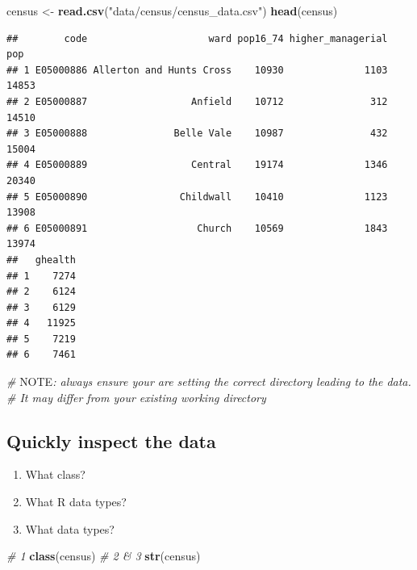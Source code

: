 \documentclass[]{book}
\newenvironment{Shaded}{\begin{snugshade}}{\end{snugshade}}
\newcommand{\AlertTok}[1]{\textcolor[rgb]{0.94,0.16,0.16}{#1}}
\newcommand{\CommentTok}[1]{\textcolor[rgb]{0.56,0.35,0.01}{\textit{#1}}}
\newcommand{\KeywordTok}[1]{\textcolor[rgb]{0.13,0.29,0.53}{\textbf{#1}}}
\newcommand{\NormalTok}[1]{#1}
\newcommand{\StringTok}[1]{\textcolor[rgb]{0.31,0.60,0.02}{#1}}
\begin{document}
\begin{Shaded}
\begin{Highlighting}[]
\NormalTok{census <-}\StringTok{ }\KeywordTok{read.csv}\NormalTok{(}\StringTok{"data/census/census_data.csv"}\NormalTok{)}
\KeywordTok{head}\NormalTok{(census)}
\end{Highlighting}
\end{Shaded}

\begin{verbatim}
##        code                     ward pop16_74 higher_managerial   pop
## 1 E05000886 Allerton and Hunts Cross    10930              1103 14853
## 2 E05000887                  Anfield    10712               312 14510
## 3 E05000888               Belle Vale    10987               432 15004
## 4 E05000889                  Central    19174              1346 20340
## 5 E05000890                Childwall    10410              1123 13908
## 6 E05000891                   Church    10569              1843 13974
##   ghealth
## 1    7274
## 2    6124
## 3    6129
## 4   11925
## 5    7219
## 6    7461
\end{verbatim}

\begin{Shaded}
\begin{Highlighting}[]
\CommentTok{# }\AlertTok{NOTE}\CommentTok{: always ensure your are setting the correct directory leading to the data. }
\CommentTok{# It may differ from your existing working directory}
\end{Highlighting}
\end{Shaded}

\hypertarget{quickly-inspect-the-data}{%
\subsection{Quickly inspect the data}\label{quickly-inspect-the-data}}

\begin{enumerate}
\def\labelenumi{\arabic{enumi}.}
\item
  What class?
\item
  What R data types?
\item
  What data types?
\end{enumerate}

\begin{Shaded}
\begin{Highlighting}[]
\CommentTok{# 1}
\KeywordTok{class}\NormalTok{(census)}
\CommentTok{# 2 & 3}
\KeywordTok{str}\NormalTok{(census)}
\end{Highlighting}
\end{Shaded}
\end{document}
